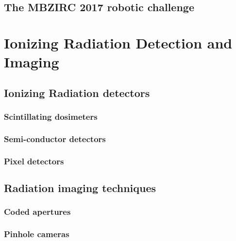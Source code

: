 \documentclass[a4paper,11pt,titlepage,twoside]{book}
\begin{document}
\section{The MBZIRC 2017 robotic challenge}



\chapter{Ionizing Radiation Detection and Imaging}


\section{Ionizing Radiation detectors}


\subsection{Scintillating dosimeters}

\subsection{Semi-conductor detectors}

\subsection{Pixel detectors}


\section{Radiation imaging techniques}


\subsection{Coded apertures}

\subsection{Pinhole cameras}
\end{document}
